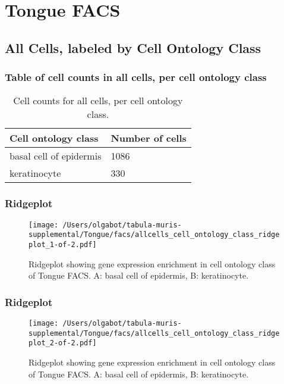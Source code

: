 \newpage
\section{Tongue FACS}

\subsection{All Cells, labeled by Cell Ontology Class}
\subsubsection{Table of cell counts in all cells, per cell ontology class}\begin{table}[h]
\centering
\label{my-label}
\begin{tabular}{@{}ll@{}}
\toprule

Cell ontology class& Number of cells \\ \midrule
basal cell of epidermis & 1086 \\

keratinocyte & 330 \\
\bottomrule
\end{tabular}
\caption{Cell counts for all cells, per cell ontology class.}
\end{table}

\newpage
\subsubsection{Ridgeplot}
\begin{figure}[h]
\centering
\texttt{[image: /Users/olgabot/tabula-muris-supplemental/Tongue/facs/allcells\_cell\_ontology\_class\_ridgeplot\_1-of-2.pdf]}

\caption{ Ridgeplot  showing gene expression enrichment in cell ontology class of Tongue FACS. A: basal cell of epidermis, B: keratinocyte.}
\end{figure}


\newpage
\newpage
\subsubsection{Ridgeplot}
\begin{figure}[h]
\centering
\texttt{[image: /Users/olgabot/tabula-muris-supplemental/Tongue/facs/allcells\_cell\_ontology\_class\_ridgeplot\_2-of-2.pdf]}

\caption{ Ridgeplot  showing gene expression enrichment in cell ontology class of Tongue FACS. A: basal cell of epidermis, B: keratinocyte.}
\end{figure}


